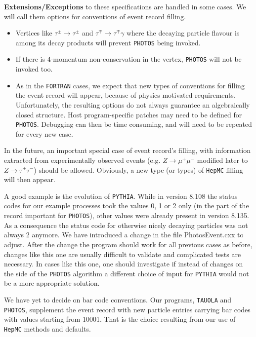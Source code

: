 \documentclass[]{Photos_interface_design}
\begin{document}
\noindent
\textbf{ Extensions/Exceptions} to these specifications are handled in some cases. We will call them
options for conventions of event record filling.
  \begin{itemize} 
    \item  Vertices like $\tau^\pm \rightarrow \tau^\pm$ and $\tau^\mp \rightarrow \tau^\mp \gamma$ 
           where the decaying particle flavour is among its decay products will prevent  {\tt PHOTOS} being invoked.

    \item  If there is  4-momentum non-conservation in the vertex,
           {\tt PHOTOS} will not be invoked too.

    \item
           As in the {\tt FORTRAN} cases, we expect that  new  types of 
           conventions for filling the event record
           will appear, because of physics motivated requirements.
           Unfortunately, the resulting options do not always guarantee
           an algebraically closed structure.  
           Host program-specific patches may need to be defined for
           {\tt PHOTOS}. 
           Debugging can then be time consuming, and will need to be repeated for every new
           case.
   \end{itemize}


 In the future,  an important special case of event record's filling, with
information extracted from experimentally observed events (e.g. $Z\to \mu^+\mu^-$
 modified later to $Z\to \tau^+\tau^-$) should be allowed.
  Obviously, a new type (or types) of {\tt HepMC} filling will then appear.

A good example is the evolution of {\tt PYTHIA}. While in version 8.108 the status codes for 
our example processes took the values 0, 1 or 2  only (in the part of the record 
important for {\tt PHOTOS}), other values were already present in
version 8.135. As a consequence the status code for 
otherwise nicely decaying particles was not always 2 anymore. We have introduced 
a change  in the file PhotosEvent.cxx to adjust. After  the change
the program should work for all previous cases as before, 
changes like this one are usually difficult to validate
and complicated  tests are necessary. In cases like this one, one should  investigate 
if instead of changes on the side of the {\tt PHOTOS} algorithm a different choice of  input for {\tt PYTHIA} would not 
be a more appropriate 
solution.

We have yet to decide on bar code conventions. Our programs, {\tt TAUOLA} and
 {\tt PHOTOS}, supplement the event record with new particle entries carrying bar codes 
with values starting from 10001. That is the choice resulting from our use 
of {\tt HepMC} methods and defaults.  
\end{document}
